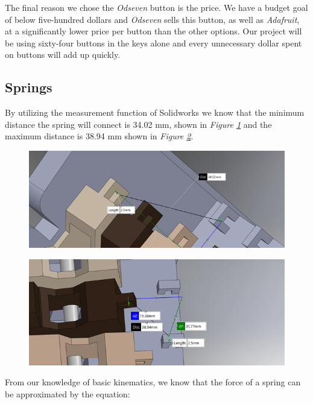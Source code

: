The final reason we chose the \textit{Odseven} button is the price. We have a budget goal of below five-hundred dollars and \textit{Odseven} sells this button, as well as \textit{Adafruit}, at a significantly lower price per button than the other options. Our project will be using sixty-four buttons in the keys alone and every unnecessary dollar spent on buttons will add up quickly.

\subsection{Springs}
By utilizing the measurement function of Solidworks we know that the minimum distance the spring will connect is 34.02 mm, shown in \textit{Figure \ref{fig:dimensions1}} and the maximum distance is 38.94 mm shown in \textit{Figure \ref{fig:dimensions2}}.

\begin{figure}[h!]
  \centering
  \includegraphics[width=\linewidth]{image/Dimensions1.png}
  \caption{}
  \label{fig:dimensions1}
\end{figure}

\begin{figure}[h!]
  \centering
  \includegraphics[width=\linewidth]{image/Dimensions2.png}
  \caption{}
  \label{fig:dimensions2}
\end{figure}

From our knowledge of basic kinematics, we know that the force of a spring can be approximated by the equation:

